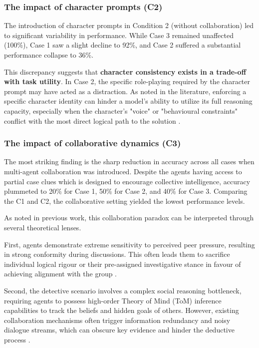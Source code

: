 \documentclass{article}
\begin{document}
\subsubsection{The impact of character prompts (C2)}

The introduction of character prompts in Condition 2 (without collaboration) led to significant variability in performance. While Case 3 remained unaffected (100\%), Case 1 saw a slight decline to 92\%, and Case 2 suffered a substantial performance collapse to 36\%.

This discrepancy suggests that \textbf{character consistency exists in a trade-off with task utility}. In Case 2, the specific role-playing required by the character prompt may have acted as a distraction. As noted in the literature, enforcing a specific character identity can hinder a model's ability to utilize its full reasoning capacity, especially when the character’s "voice" or "behavioural constraints" conflict with the most direct logical path to the solution \citep{shao2023characterllm, samuel2024personagym}.

\subsubsection{The impact of collaborative dynamics (C3)}

The most striking finding is the sharp reduction in accuracy across all cases when multi-agent collaboration was introduced. Despite the agents having access to partial case clues which is designed to encourage collective intelligence, accuracy plummeted to 20\% for Case 1, 50\% for Case 2, and 40\% for Case 3. Comparing the C1 and C2, the collaborative setting yielded the lowest performance levels.

As noted in previous work, this collaboration paradox can be interpreted through several theoretical lenses. 

First, agents demonstrate extreme sensitivity to perceived peer pressure, resulting in strong conformity during discussions. This often leads them to sacrifice individual logical rigour or their pre-assigned investigative stance in favour of achieving alignment with the group \citep{baltaji2024cultured}.

Second, the detective scenario involves a complex social reasoning bottleneck, requiring agents to possess high-order Theory of Mind (ToM) inference capabilities to track the beliefs and hidden goals of others. However, existing collaboration mechanisms often trigger information redundancy and noisy dialogue streams, which can obscure key evidence and hinder the deductive process \citep{ wu2024jubensha, zhu2024player, guo2026collab}.
\end{document}
